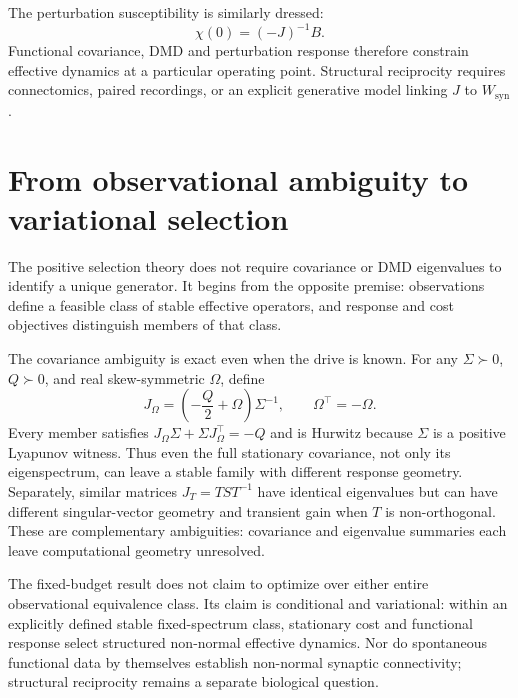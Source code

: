 \documentclass[
  aps,prl,preprint,notitlepage,superscriptaddress,nofootinbib,longbibliography,
  amsmath,amssymb
]{revtex4-2}
\begin{document}
The perturbation susceptibility is similarly dressed:
\begin{equation}
\chi(0)=(-J)^{-1}B.
\end{equation}
Functional covariance, DMD and perturbation response therefore constrain
effective dynamics at a particular operating point. Structural reciprocity
requires connectomics, paired recordings, or an explicit generative model
linking $J$ to $W_{\mathrm{syn}}$.

\section{From observational ambiguity to variational selection}
\label{sec:s-identifiability}

The positive selection theory does not require covariance or DMD eigenvalues to
identify a unique generator.  It begins from the opposite premise: observations
define a feasible class of stable effective operators, and response and cost
objectives distinguish members of that class.

The covariance ambiguity is exact even when the drive is known.  For any
$\Sigma\succ0$, $Q\succ0$, and real skew-symmetric $\Omega$, define
\begin{equation}
J_\Omega=\left(-\frac{Q}{2}+\Omega\right)\Sigma^{-1},
\qquad \Omega^\top=-\Omega.
\label{eq:s-covariance-family}
\end{equation}
Every member satisfies
$J_\Omega\Sigma+\Sigma J_\Omega^\top=-Q$ and is Hurwitz because $\Sigma$ is a
positive Lyapunov witness.  Thus even the full stationary covariance, not only
its eigenspectrum, can leave a stable family with different response geometry.
Separately, similar matrices $J_T=TST^{-1}$ have identical eigenvalues but can
have different singular-vector geometry and transient gain when $T$ is
non-orthogonal.  These are complementary ambiguities: covariance and eigenvalue
summaries each leave computational geometry unresolved.

The fixed-budget result does not claim to optimize over either entire
observational equivalence class.  Its claim is conditional and variational:
within an explicitly defined stable fixed-spectrum class, stationary cost and
functional response select structured non-normal effective dynamics.  Nor do
spontaneous functional data by themselves establish non-normal synaptic
connectivity; structural reciprocity remains a separate biological question.
\end{document}
